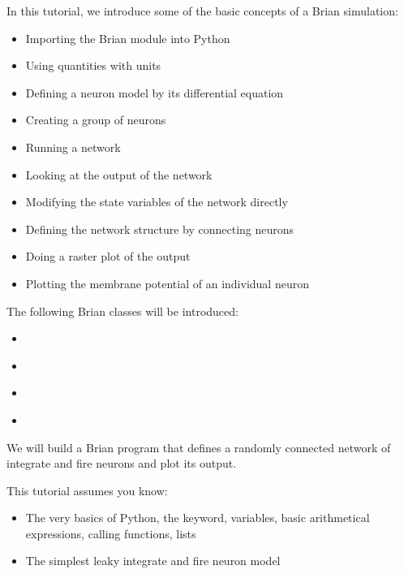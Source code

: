 \documentclass[letterpaper,10pt,english]{manual}
\begin{document}
In this tutorial, we introduce some of the basic concepts of a Brian simulation:
\begin{itemize}
\item {} 
Importing the Brian module into Python

\item {} 
Using quantities with units

\item {} 
Defining a neuron model by its differential equation

\item {} 
Creating a group of neurons

\item {} 
Running a network

\item {} 
Looking at the output of the network

\item {} 
Modifying the state variables of the network directly

\item {} 
Defining the network structure by connecting neurons

\item {} 
Doing a raster plot of the output

\item {} 
Plotting the membrane potential of an individual neuron

\end{itemize}

The following Brian classes will be introduced:
\begin{itemize}
\item {} 
\hyperlink{brian.NeuronGroup}{}

\item {} 
\hyperlink{brian.Connection}{}

\item {} 
\hyperlink{brian.SpikeMonitor}{}

\item {} 
\hyperlink{brian.StateMonitor}{}

\end{itemize}

We will build a Brian program that defines a randomly connected network of integrate
and fire neurons and plot its output.

This tutorial assumes you know:
\begin{itemize}
\item {} 
The very basics of Python, the  keyword, variables, basic
arithmetical expressions, calling functions, lists

\item {} 
The simplest leaky integrate and fire neuron model

\end{itemize}
\end{document}
